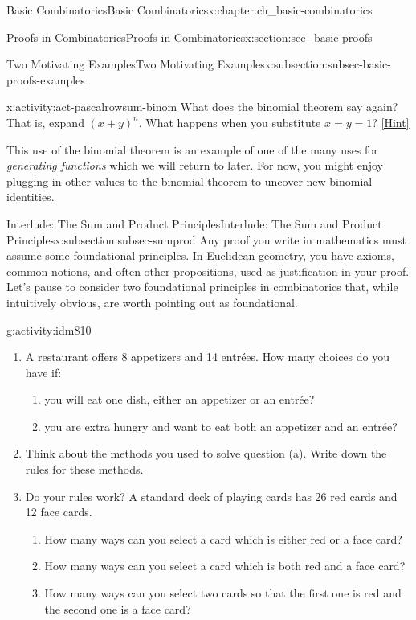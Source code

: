 \documentclass[oneside,10pt,]{book}
\numberwithin{equation}{chapter}
\begin{document}
\begin{chapterptx}{Basic Combinatorics}{}{Basic Combinatorics}{}{}{x:chapter:ch_basic-combinatorics}
\begin{sectionptx}{Proofs in Combinatorics}{}{Proofs in Combinatorics}{}{}{x:section:sec_basic-proofs}
\begin{subsectionptx}{Two Motivating Examples}{}{Two Motivating Examples}{}{}{x:subsection:subsec-basic-proofs-examples}
\begin{activity}{}{x:activity:act-pascalrowsum-binom}
What does the binomial theorem say again?  That is, expand \((x+y)^n\).  What happens when you substitute \(x = y = 1\)?%
\space\hspace*{0pt}\hfill{\tiny\hyperlink{g:hint:idm797-back}{[Hint]}}\end{activity}
This use of the binomial theorem is an example of one of the many uses for \emph{generating functions} which we will return to later.  For now, you might enjoy plugging in other values to the binomial theorem to uncover new binomial identities.%
\end{subsectionptx}
%
%
\typeout{************************************************}
\typeout{************************************************}
%
\begin{subsectionptx}{Interlude: The Sum and Product Principles}{}{Interlude: The Sum and Product Principles}{}{}{x:subsection:subsec-sumprod}
Any proof you write in mathematics must assume some foundational principles.  In Euclidean geometry, you have axioms, common notions, and often other propositions, used as justification in your proof.  Let's pause to consider two foundational principles in combinatorics that, while intuitively obvious, are worth pointing out as foundational.%
\begin{activity}{}{g:activity:idm810}%
\begin{enumerate}[font=\bfseries,label=(\alph*),ref=\alph*]
\item{}A restaurant offers 8 appetizers and 14 entrées. How many choices do you have if:%
\begin{enumerate}
\item{}you will eat one dish, either an appetizer or an entrée?%
\item{}you are extra hungry and want to eat both an appetizer and an entrée?%
\end{enumerate}
%
\item{}Think about the methods you used to solve question (a). Write down the rules for these methods.%
\item{}Do your rules work? A standard deck of playing cards has 26 red cards and 12 face cards.%
\begin{enumerate}
\item{}How many ways can you select a card which is either red or a face card?%
\item{}How many ways can you select a card which is both red and a face card?%
\item{}How many ways can you select two cards so that the first one is red and the second one is a face card?%

\end{enumerate}
\end{enumerate}
\end{activity}
\end{subsectionptx}
\end{sectionptx}
\end{chapterptx}
\end{document}
